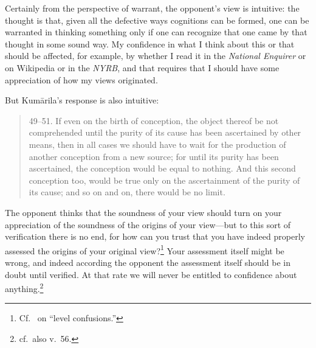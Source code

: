 ﻿\documentclass[11pt]{amsart}
\begin{document}
Certainly from the perspective of warrant, the opponent's view is intuitive: the thought is that, given all the defective ways cognitions can be formed, one can be warranted in thinking something only if one can recognize that one came by that thought in some sound way. My confidence in what I think about this or that should be affected, for example, by whether I read it in the \emph{National Enquirer} or on Wikipedia or in the \emph{NYRB}, and that requires that I should have some appreciation of how my views originated.

But Kum\=arila's response is also intuitive:\small \begin{quote}49--51. If even on the birth of conception, the object thereof be not comprehended until the purity of its cause has been ascertained by other means, then in all cases we should have to wait for the production of another conception from a new source; for until its purity has been ascertained, the conception would be equal to nothing. And this second conception too, would be true only on the ascertainment of the purity of its cause; and so on and on, there would be no limit.\end{quote}\normalsize The opponent thinks that the soundness of your view should turn on your appreciation of the soundness of the origins of your view---but to this sort of verification there is no end, for how can you trust that you have indeed properly assessed the origins of your original view?\footnote{Cf.~\citet{alston1980level} on ``level confusions.''} Your assessment itself might be wrong, and indeed according the opponent the assessment itself should be in doubt until verified. At that rate we will never be entitled to confidence about anything.\footnote{cf.~also v.~56.}
\end{document}
